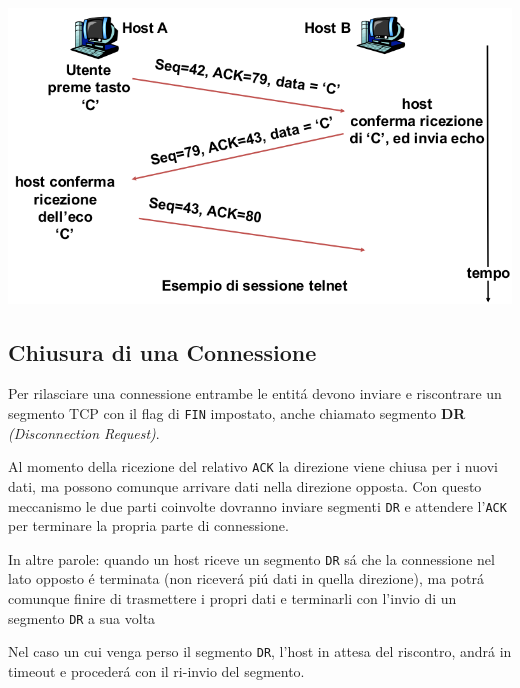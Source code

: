 \documentclass[12pt]{article}
\def\code#1{\texttt{#1}}
\begin{document}
\begin{center}
	\includegraphics[scale=0.4]{livello_trasporto-img2.png}
\end{center}

\subsection{Chiusura di una Connessione}\label{tcp-chiusura-connessione}
Per rilasciare una connessione entrambe le entit\'a devono inviare e riscontrare un segmento TCP con il flag di 
\code{FIN} impostato, anche chiamato segmento \textbf{DR} \textit{(Disconnection Request)}.

Al momento della ricezione del relativo \code{ACK} la direzione viene chiusa per i nuovi dati, ma possono comunque 
arrivare dati nella direzione opposta. Con questo meccanismo le due parti coinvolte dovranno inviare segmenti 
\code{DR} e attendere l'\code{ACK} per terminare la propria parte di connessione.

In altre parole: quando un host riceve un segmento \code{DR} s\'a che la connessione nel lato opposto \'e terminata 
(non ricever\'a pi\'u dati in quella direzione), ma potr\'a comunque finire di trasmettere i propri dati e terminarli 
con l'invio di un segmento \code{DR} a sua volta

Nel caso un cui venga perso il segmento \code{DR}, l'host in attesa del riscontro, andr\'a in timeout e proceder\'a 
con il ri-invio del segmento.
\end{document}
